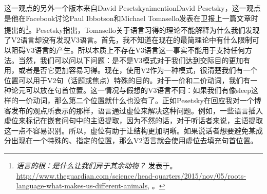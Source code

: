 这一观点的另外一个版本来自David Pesetskyaimention{David Pesetsky}，这一观点是他在Facebook讨论Paul Ibbotson和Michael Tomasello发表在卫报上一篇文章时提出的\footnote{%
\emph{语言的根：是什么让我们异于其余动物？} 发表于。
\url{http://www.theguardian.com/science/head-quarters/2015/nov/05/roots-language-what-makes-us-different-animals}, 。
}。Pesetsky指出，Tomasello关于语言习得的理论不能解释为什么我们发现了V2语言却没有发现V3语言。首先，我不知道在现在的最简理论中有什么限制可以阻碍V3语言的产生。所以本质上不存在V3语言这一事实不能用于支持任何方法。当然，我们可以问以下问题：是不是V3模式对于我们达到交际目的更加有用，或者是否它更加容易习得。现在，使用V2作为一种模式，很清楚我们有一个位置可以用于V2句（话题或焦点）特殊的目的。对于一价和二价动词，我们有一种论元可以放在句首位置。这一情况与假想的V3语言不同：如果我们有像sleep这样的一价动词，那么第二个位置就什么也没有了。正如Pesetsky在回应我对一个博客发布的观点所表示的那样，语言通过虚位来解决这种问题。例如，一些语言插入虚位来标记在嵌套问句中的主语提取，因为不然的话，对于听话者来说，主语提取这一点不容易识别。所以，虚位有助于让结构更加明晰。如果说话者想要避免某成分出现在一个特殊的、指定的位置，那么V2语言就会使用虚位去填充句首位置。
